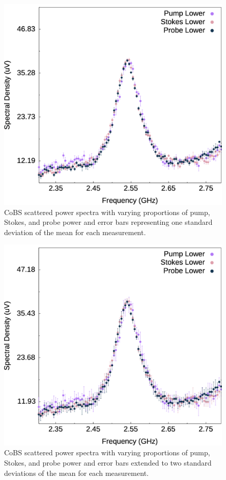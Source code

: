 \begin{figure}[ht]
  \centering
  \includegraphics[width=\textwidth]{figs/3-CoBS/PSPr-Contribute-Equally.png}
  \caption{\ac{CoBS} scattered power spectra with varying proportions of pump, Stokes, and probe power and error bars representing one standard deviation of the mean for each measurement.}
  \label{fig:PSPr-Contribute-Equally}
\end{figure}

\begin{figure}[ht]
  \centering
  \includegraphics[width=\textwidth]{figs/3-CoBS/PSPr-Contribute-Equally-2sigma.png}
  \caption{\ac{CoBS} scattered power spectra with varying proportions of pump, Stokes, and probe power and error bars extended to two standard deviations of the mean for each measurement.}
  \label{fig:PSPr-Contribute-Equally-2sigma}
\end{figure}

\FloatBarrier

\newpage


